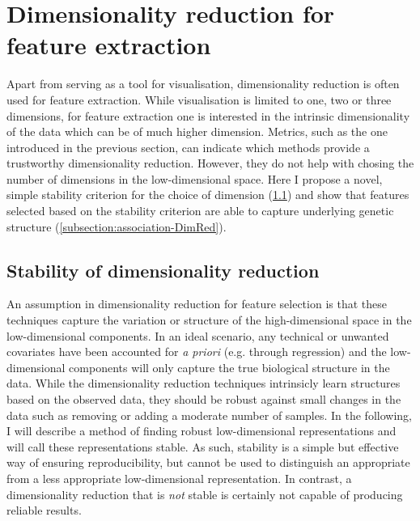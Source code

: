 \section{Dimensionality reduction for feature extraction}
Apart from serving as a tool for visualisation, dimensionality reduction is often used for feature extraction. While visualisation is limited to one, two or three dimensions, for feature extraction one is interested in the intrinsic dimensionality of the data which can be of much higher dimension. Metrics, such as the one introduced in the previous section, can indicate which methods provide a trustworthy dimensionality reduction. However, they do not help with chosing the number of dimensions in the low-dimensional space. Here I propose a novel, simple stability criterion for the choice of dimension (\cref{subsection:stability-DimRed}) and show that features selected based on the stability criterion are able to capture underlying genetic structure (\cref{subsection:association-DimRed}).

\subsection{Stability of dimensionality reduction}
\label{subsection:stability-DimRed}
An assumption in dimensionality reduction for feature selection is that these techniques capture the variation or structure of the high-dimensional space in the low-dimensional components. In an ideal scenario, any technical or unwanted covariates have been accounted for \textit{a priori} (e.g. through regression) and the low-dimensional components will only capture the true biological structure in the data. While the dimensionality reduction techniques intrinsicly learn structures based on the observed data, they should be robust against small changes in the data such as removing or adding a moderate number of samples. In the following, I will describe a method of finding robust low-dimensional representations and will call these representations stable.  As such, stability is a simple but effective way of ensuring reproducibility, but cannot be used to distinguish an appropriate from a less appropriate low-dimensional representation. In contrast, a dimensionality reduction that is \textit{not} stable is certainly not capable of producing reliable results.

